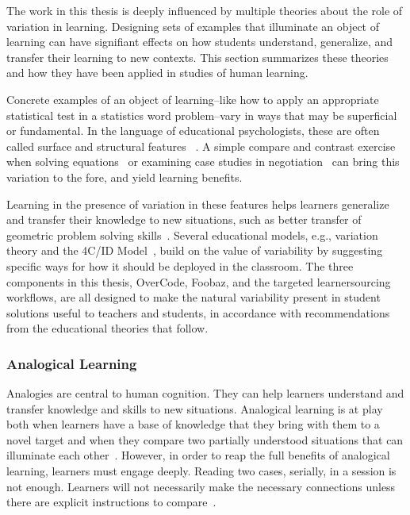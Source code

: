 The work in this thesis is deeply influenced by multiple theories about the role of variation in learning. Designing sets of examples that illuminate an object of learning can have signifiant effects on how students understand, generalize, and transfer their learning to new contexts. This section summarizes these theories and how they have been applied in studies of human learning.


Concrete examples of an object of learning--like how to apply an appropriate statistical test in a statistics word problem--vary in ways that may be superficial or fundamental. In the language of educational psychologists, these are often called surface and structural features ~\cite{quilicimayer}. A simple compare and contrast exercise when solving equations~\cite{rittle2007does} or examining case studies in negotiation~\cite{loewenstein2003analogical} can bring this variation to the fore, and yield learning benefits.

Learning in the presence of variation in these features helps learners generalize and transfer their knowledge to new situations, such as better transfer of geometric problem solving skills~\cite{workedexamplesvariability,Variabilityofpractice}. Several educational models, e.g., variation theory and the 4C/ID Model~\cite{van2002blueprints}, build on the value of variability by suggesting specific ways for how it should be deployed in the classroom. The three components in this thesis, OverCode, Foobaz, and the targeted learnersourcing workflows, are all designed to make the natural variability present in student solutions useful to teachers and students, in accordance with recommendations from the educational theories that follow.

\subsubsection{Analogical Learning}

Analogies are central to human cognition. They can help learners understand and transfer knowledge and skills to new situations. Analogical learning is at play both when learners have a base of knowledge that they bring with them to a novel target and when they compare two partially understood situations that can illuminate each other~\cite{kurtz01learning,loewenstein2003analogical}. However, in order to reap the full benefits of analogical learning, learners must engage deeply. Reading two cases, serially, in a session is not enough. Learners will not necessarily make the necessary connections unless there are explicit instructions to compare~\cite{loewenstein2003analogical,catrambone1989overcoming}. 

